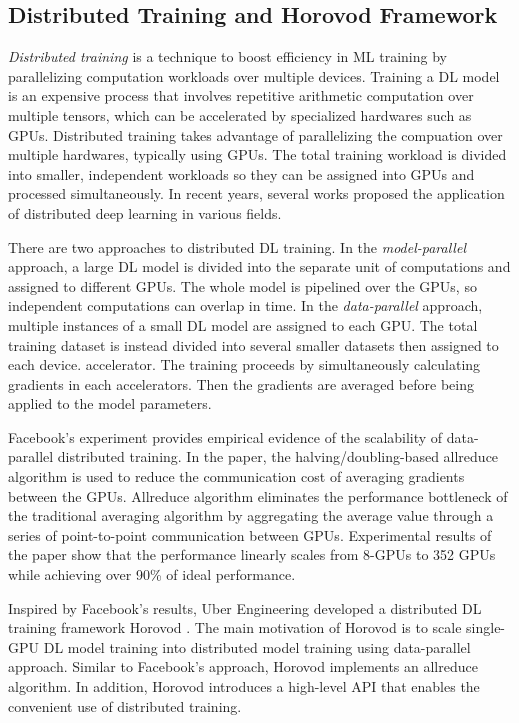\subsection{Distributed Training and Horovod Framework}

\textit{Distributed training} is a technique to boost efficiency in ML training
by parallelizing computation workloads over multiple devices.
Training a DL model is an expensive process that involves repetitive
arithmetic computation over multiple tensors,
which can be accelerated by specialized hardwares such as GPUs. 
Distributed training takes advantage of parallelizing the compuation over
multiple hardwares, typically using GPUs.
The total training workload is divided into smaller, independent workloads
so they can be assigned into GPUs and processed simultaneously. 
In recent years, several works proposed the application of distributed
deep learning in various fields.

There are two approaches to distributed DL training.
In the \textit{model-parallel} approach, a large DL model is divided into 
the separate unit of computations and assigned to different GPUs. 
The whole model is pipelined over the GPUs, so independent computations
can overlap in time.
In the \textit{data-parallel} approach, multiple instances of a small DL model
are assigned to each GPU. The total training dataset is instead
divided into several smaller datasets then assigned to each device.
accelerator. The training proceeds by simultaneously calculating gradients
in each accelerators. Then the gradients are averaged before being 
applied to the model parameters.

Facebook's experiment \cite{facebook2018} provides empirical evidence of
the scalability of data-parallel distributed training. In the paper, 
the halving/doubling-based allreduce algorithm is used to reduce the communication 
cost of averaging gradients between the GPUs. 
Allreduce algorithm eliminates the performance bottleneck of the traditional
averaging algorithm by aggregating the average value through a series of
point-to-point communication between GPUs. 
Experimental results of the paper show that the performance linearly
scales from 8-GPUs to 352 GPUs while achieving over 90\% of ideal performance.

Inspired by Facebook's results, Uber Engineering developed a distributed DL
training framework Horovod \cite{sergeev2018horovod}. 
The main motivation of Horovod is to scale single-GPU DL model training
into distributed model training using data-parallel approach. 
Similar to Facebook's approach, Horovod implements an allreduce algorithm. 
In addition, Horovod introduces a high-level API that enables
the convenient use of distributed training.  
